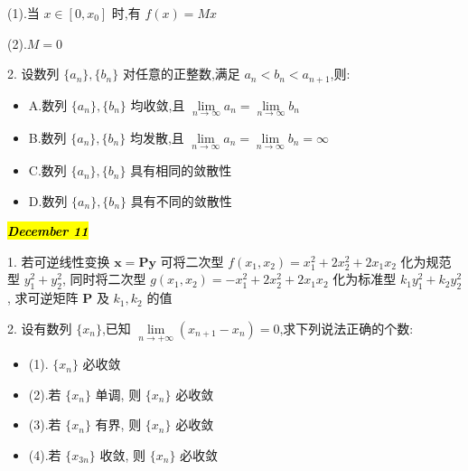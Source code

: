 (1).当 $x\in[0,x_{0}]$ 时,有 $f(x)=Mx$

(2).$M=0$
\begin{solution}
	
\end{solution}

2. 设数列 $\{a_{n}\},\{b_{n}\}$ 对任意的正整数,满足 $a_{n}<b_{n}<a_{n+1}$,则:
\begin{itemize}
	\item A.数列 $\{a_{n}\},\{b_{n}\}$ 均收敛,且 $\lim\limits_{n\rightarrow  \infty}a_{n}=\lim\limits_{n\rightarrow \infty}b_{n}$
	\item B.数列 $\{a_{n}\},\{b_{n}\}$ 均发散,且 $\lim\limits_{n\rightarrow  \infty}a_{n}=\lim\limits_{n\rightarrow \infty}b_{n}=\infty$
	\item C.数列 $\{a_{n}\},\{b_{n}\}$ 具有相同的敛散性
	\item D.数列 $\{a_{n}\},\{b_{n}\}$ 具有不同的敛散性
\end{itemize}
\begin{solution}
	
\end{solution}

\hl{\textbf{\textit{December 11}}}

1. 若可逆线性变换 $\mathbf{x=Py}$ 可将二次型 $f(x_{1},x_{2})=x_{1}^{2}+2x_{2}^{2}+2x_{1}x_{2}$ 化为规范型 $y_{1}^{2}+y_{2}^{2}$,
同时将二次型 $g(x_{1},x_{2})=-x_{1}^{2}+2x_{2}^{2}+2x_{1}x_{2}$ 化为标准型 $k_{1}y_{1}^{2}+k_{2}y_{2}^{2}$, 求可逆矩阵 $\mathbf{P}$ 及 $k_{1},k_{2}$ 的值
\begin{solution}
	
\end{solution}

2. 设有数列 $\{x_{n}\}$,已知 $\lim\limits_{n\rightarrow +\infty}(x_{n+1}-x_{n})=0$,求下列说法正确的个数:
\begin{itemize}
	\item (1). $\{x_{n}\}$ 必收敛
	\item (2).若 $\{x_{n}\}$ 单调, 则 $\{x_{n}\}$ 必收敛
	\item (3).若 $\{x_{n}\}$ 有界, 则 $\{x_{n}\}$ 必收敛
	\item (4).若 $\{x_{3n}\}$ 收敛, 则 $\{x_{n}\}$ 必收敛
\end{itemize}
\begin{solution}
	
\end{solution}

